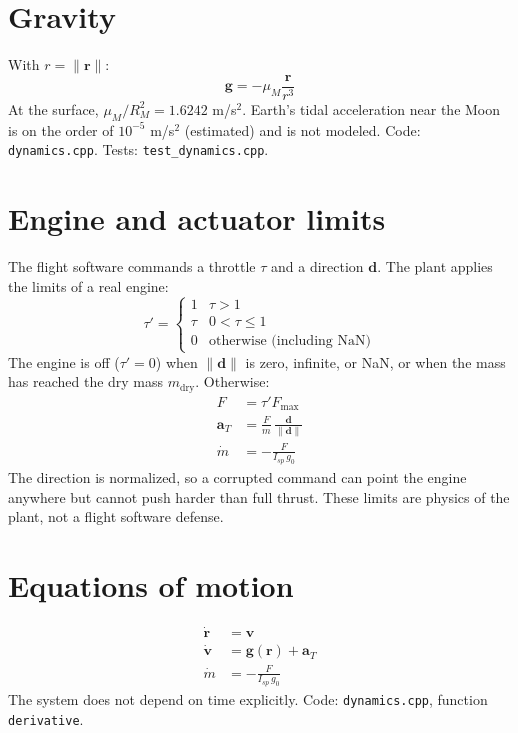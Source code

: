 \documentclass[11pt]{article}
\begin{document}
\section{Gravity}
With $r = \lVert\mathbf{r}\rVert$:
\begin{equation}
\mathbf{g} = -\mu_M\frac{\mathbf{r}}{r^3}
\end{equation}
At the surface, $\mu_M / R_M^2 = 1.6242$ m/s$^2$. Earth's tidal acceleration near the
Moon is on the order of $10^{-5}$ m/s$^2$ (estimated) and is not modeled.
Code: \texttt{dynamics.cpp}. Tests: \texttt{test\_dynamics.cpp}.

\section{Engine and actuator limits}
The flight software commands a throttle $\tau$ and a direction $\mathbf{d}$. The plant
applies the limits of a real engine:
\begin{equation}
\tau' = \begin{cases} 1 & \tau > 1\\ \tau & 0 < \tau \le 1\\ 0 & \text{otherwise (including NaN)}\end{cases}
\end{equation}
The engine is off ($\tau'=0$) when $\lVert\mathbf{d}\rVert$ is zero, infinite, or NaN,
or when the mass has reached the dry mass $m_{\mathrm{dry}}$. Otherwise:
\begin{align}
F &= \tau' F_{\max} \\
\mathbf{a}_T &= \frac{F}{m}\,\frac{\mathbf{d}}{\lVert\mathbf{d}\rVert} \\
\dot m &= -\frac{F}{I_{sp}\,g_0}
\end{align}
The direction is normalized, so a corrupted command can point the engine anywhere but
cannot push harder than full thrust. These limits are physics of the plant, not a
flight software defense.

\section{Equations of motion}
\begin{align}
\dot{\mathbf{r}} &= \mathbf{v} \\
\dot{\mathbf{v}} &= \mathbf{g}(\mathbf{r}) + \mathbf{a}_T \\
\dot m &= -\frac{F}{I_{sp}\,g_0}
\end{align}
The system does not depend on time explicitly.
Code: \texttt{dynamics.cpp}, function \texttt{derivative}.
\end{document}
